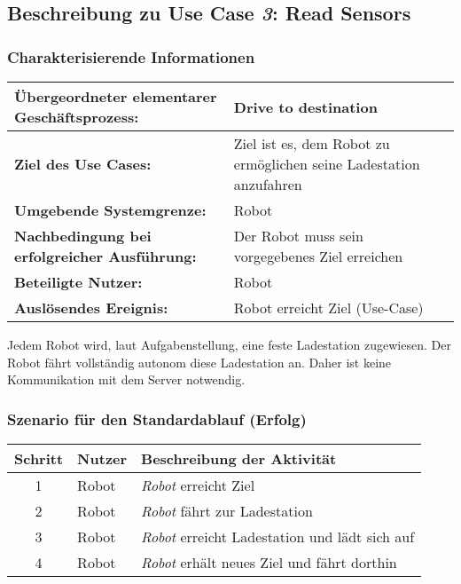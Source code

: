 \documentclass[includeheaders]{scrartcl}
\begin{document}

		\subsection{Beschreibung zu Use Case \emph{3}: Read Sensors}

			\subsubsection*{Charakterisierende Informationen}

			\begin{table}[H]
				\centering
				\begin{tabularx}{\textwidth}{@{}p{5cm}X@{}}
				\toprule
				\textbf{Übergeordneter elementarer Geschäftsprozess:} & Drive to destination\\ \midrule
				\textbf{Ziel des Use Cases:} & Ziel ist es, dem Robot zu ermöglichen seine Ladestation anzufahren\\ \midrule
				\textbf{Umgebende Systemgrenze:} & Robot\\ \midrule
				\textbf{Nachbedingung bei erfolgreicher Ausführung:} & Der Robot muss sein vorgegebenes Ziel erreichen\\ \midrule
				\textbf{Beteiligte Nutzer:} & Robot\\ \midrule
				\textbf{Auslösendes Ereignis:} & Robot erreicht Ziel (Use-Case)\\ 
				\bottomrule
				\end{tabularx}
			\end{table}

			Jedem Robot wird, laut Aufgabenstellung, eine feste Ladestation zugewiesen. Der Robot fährt vollständig autonom diese Ladestation an. Daher ist keine Kommunikation mit dem Server notwendig.
			
			\subsubsection*{Szenario für den Standardablauf (Erfolg)}

			\begin{table}[H]
				\centering
				\begin{tabularx}{\textwidth}{@{}cp{2cm}X@{}}
				\toprule
				Schritt & Nutzer & Beschreibung der Aktivität \\ \midrule
				1 & Robot & \emph{Robot} erreicht Ziel \\
				2 & Robot & \emph{Robot} fährt zur Ladestation \\
				3 & Robot & \emph{Robot} erreicht Ladestation und lädt sich auf \\
				4 & Robot & \emph{Robot} erhält neues Ziel und fährt dorthin \\
				\bottomrule
				\end{tabularx}
			\end{table}
\end{document}
